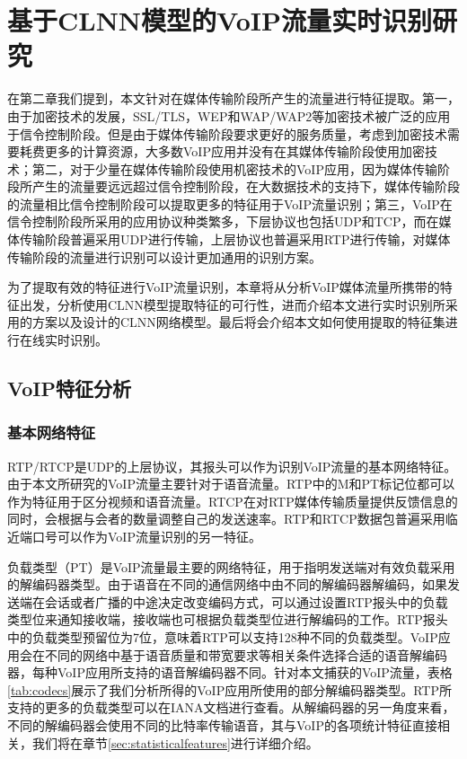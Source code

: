 \chapter{基于CLNN模型的VoIP流量实时识别研究}
在第二章我们提到，本文针对在媒体传输阶段所产生的流量进行特征提取。第一，由于加密技术的发展，SSL/TLS，WEP和WAP/WAP2等加密技术被广泛的应用于信令控制阶段。但是由于媒体传输阶段要求更好的服务质量，考虑到加密技术需要耗费更多的计算资源，大多数VoIP应用并没有在其媒体传输阶段使用加密技术；第二，对于少量在媒体传输阶段使用机密技术的VoIP应用，因为媒体传输阶段所产生的流量要远远超过信令控制阶段，在大数据技术的支持下，媒体传输阶段的流量相比信令控制阶段可以提取更多的特征用于VoIP流量识别；第三，VoIP在信令控制阶段所采用的应用协议种类繁多，下层协议也包括UDP和TCP，而在媒体传输阶段普遍采用UDP进行传输，上层协议也普遍采用RTP进行传输，对媒体传输阶段的流量进行识别可以设计更加通用的识别方案。


为了提取有效的特征进行VoIP流量识别，本章将从分析VoIP媒体流量所携带的特征出发，分析使用CLNN模型提取特征的可行性，进而介绍本文进行实时识别所采用的方案以及设计的CLNN网络模型。最后将会介绍本文如何使用提取的特征集进行在线实时识别。
\section{VoIP特征分析}

\subsection{基本网络特征}
RTP/RTCP是UDP的上层协议，其报头可以作为识别VoIP流量的基本网络特征。由于本文所研究的VoIP流量主要针对于语音流量。RTP中的M和PT标记位都可以作为特征用于区分视频和语音流量。RTCP在对RTP媒体传输质量提供反馈信息的同时，会根据与会者的数量调整自己的发送速率。RTP和RTCP数据包普遍采用临近端口号可以作为VoIP流量识别的另一特征。

负载类型（PT）是VoIP流量最主要的网络特征，用于指明发送端对有效负载采用的解编码器类型。由于语音在不同的通信网络中由不同的解编码器解编码，如果发送端在会话或者广播的中途决定改变编码方式，可以通过设置RTP报头中的负载类型位来通知接收端，接收端也可根据负载类型位进行解编码的工作。RTP报头中的负载类型预留位为7位，意味着RTP可以支持128种不同的负载类型。VoIP应用会在不同的网络中基于语音质量和带宽要求等相关条件选择合适的语音解编码器，每种VoIP应用所支持的语音解编码器不同。针对本文捕获的VoIP流量，表格\ref{tab:codecs}展示了我们分析所得的VoIP应用所使用的部分解编码器类型。RTP所支持的更多的负载类型可以在IANA文档\supercite{rtppt}进行查看。从解编码器的另一角度来看，不同的解编码器会使用不同的比特率传输语音，其与VoIP的各项统计特征直接相关，我们将在章节\ref{sec:statisticalfeatures}进行详细介绍。

